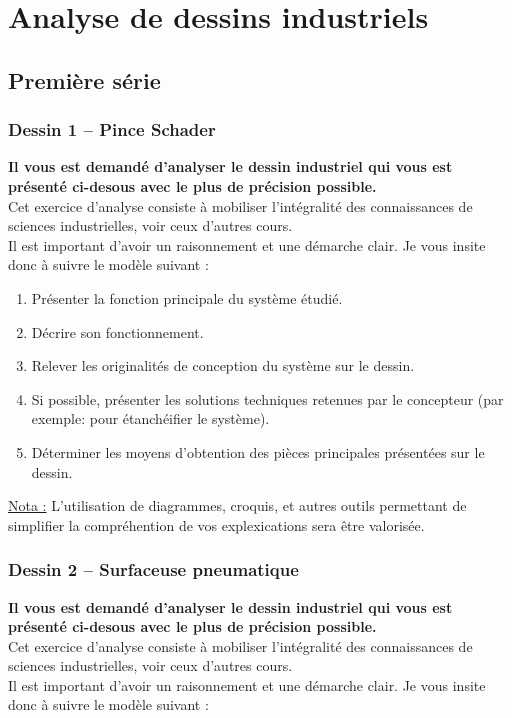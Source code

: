 \chapter{Analyse de dessins industriels}
\thispagestyle{plain} %
\newpage


\section{Première série}

\subsection{Dessin 1 -- Pince Schader}
\textbf{Il vous est demandé d'analyser le dessin industriel qui vous est présenté ci-desous avec le plus de précision possible.}\\
Cet exercice d'analyse consiste à mobiliser l'intégralité des connaissances de sciences industrielles, voir ceux d'autres cours.\\
Il est important d'avoir un raisonnement et une démarche clair. Je vous insite donc à suivre le modèle suivant :

\begin{enumerate}
\item Présenter la fonction principale du système étudié.
\item Décrire son fonctionnement.
\item Relever les originalités de conception du système sur le dessin.
\item Si possible, présenter les solutions techniques retenues par le concepteur (par exemple: pour étanchéifier le système).
\item Déterminer les moyens d'obtention des pièces principales présentées sur le dessin.
\end{enumerate}

\underline{Nota :} L'utilisation de diagrammes, croquis, et autres outils permettant de simplifier la compréhention de vos explexications sera être valorisée.



\subsection{Dessin 2 -- Surfaceuse pneumatique}
\textbf{Il vous est demandé d'analyser le dessin industriel qui vous est présenté ci-desous avec le plus de précision possible.}\\
Cet exercice d'analyse consiste à mobiliser l'intégralité des connaissances de sciences industrielles, voir ceux d'autres cours.\\
Il est important d'avoir un raisonnement et une démarche clair. Je vous insite donc à suivre le modèle suivant :

